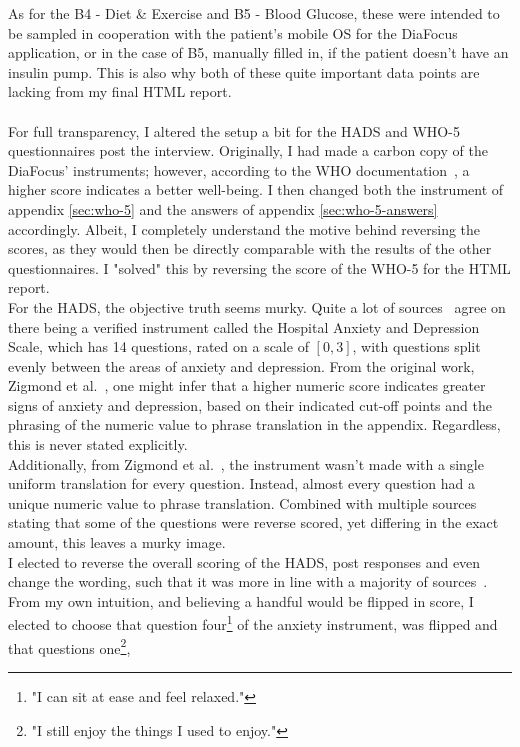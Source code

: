 \noindent
As for the B4 - Diet \& Exercise and B5 - Blood Glucose, these were intended to be sampled in cooperation with the patient's mobile OS for the DiaFocus application, or in the case of B5, manually filled in, if the patient doesn't have an insulin pump. This is also why both of these quite important data points are lacking from my final HTML report.
\\
\\
For full transparency, I altered the setup a bit for the HADS and WHO-5 questionnaires post the interview. Originally, I had made a carbon copy of the DiaFocus' instruments; however, according to the WHO documentation~\cite{WHO5}, a higher score indicates a better well-being. I then changed both the instrument of appendix \autoref{sec:who-5} and the answers of appendix \autoref{sec:who-5-answers} accordingly. Albeit, I completely understand the motive behind reversing the scores, as they would then be directly comparable with the results of the other questionnaires. I "solved" this by reversing the score of the WHO-5 for the HTML report. 
\\
For the HADS, the objective truth seems murky. Quite a lot of sources~\cite{Wiki-HADS, DiaFocus, HADS, HADS-StrokeEngine, HADS-2017, HADS-Danish} agree on there being a verified instrument called the Hospital Anxiety and Depression Scale, which has 14 questions, rated on a scale of $[0, 3]$, with questions split evenly between the areas of anxiety and depression. From the original work, Zigmond et al.~\cite{HADS}, one might infer that a higher numeric score indicates greater signs of anxiety and depression, based on their indicated cut-off points and the phrasing of the numeric value to phrase translation in the appendix. Regardless, this is never stated explicitly.  
\\
Additionally, from Zigmond et al.~\cite{HADS}, the instrument wasn't made with a single uniform translation for every question. Instead, almost every question had a unique numeric value to phrase translation. Combined with multiple sources~\cite{HADS-StrokeEngine, HADS-Danish}  stating that some of the questions were reverse scored, yet differing in the exact amount, this leaves a murky image.
\\
I elected to reverse the overall scoring of the HADS, post responses and even change the wording, such that it was more in line with a majority of sources~\cite{HADS, HADS-StrokeEngine, HADS-2017, HADS-Danish}. From my own intuition, and believing a handful would be flipped in score, I elected to choose that question four\footnote{"I can sit at ease and feel relaxed."} of the anxiety instrument, was flipped and that questions one\footnote{"I still enjoy the things I used to enjoy."}, 
